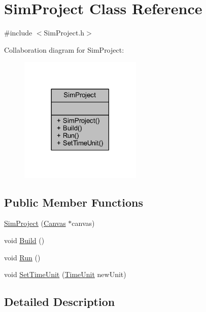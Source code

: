 \hypertarget{class_sim_project}{}\section{Sim\+Project Class Reference}
\label{class_sim_project}


{\ttfamily \#include $<$Sim\+Project.\+h$>$}



Collaboration diagram for Sim\+Project\+:
\nopagebreak
\begin{figure}[H]
\begin{center}
\leavevmode
\includegraphics[width=165pt]{class_sim_project__coll__graph}
\end{center}
\end{figure}
\subsection*{Public Member Functions}
\begin{DoxyCompactItemize}
\item 
\hyperlink{class_sim_project_a970fe219d4659b02bf5e870a69351399}{Sim\+Project} (\hyperlink{class_canvas}{Canvas} $\ast$canvas)
\item 
void \hyperlink{class_sim_project_afefd1eb6d63ea4e0c698084d51a29fcd}{Build} ()
\item 
void \hyperlink{class_sim_project_a955725a364c7a26c2991a0013976fc73}{Run} ()
\item 
void \hyperlink{class_sim_project_aa54bb0c929580649657d667f4c19646c}{Set\+Time\+Unit} (\hyperlink{_simulation_executive_8h_add9fe45e09605eee3e4a39c8a5c4476d}{Time\+Unit} new\+Unit)
\end{DoxyCompactItemize}


\subsection{Detailed Description}


